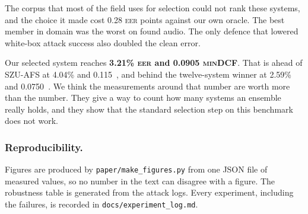 \documentclass[twocolumn,a4paper,11pt]{article}
\newcommand{\eer}{\textsc{eer}}
\newcommand{\mindcf}{\textsc{minDCF}}
\begin{document}
The corpus that most of the field uses for selection could not rank these
systems, and the choice it made cost 0.28 \eer{} points against our own
oracle. The best member in domain was the worst on found audio. The only
defence that lowered white-box attack success also doubled the clean error.

Our selected system reaches \textbf{3.21\% \eer{} and 0.0905 \mindcf{}}. That is
ahead of SZU-AFS at 4.04\% and 0.115~\cite{szuafs}, and behind the
twelve-system winner at 2.59\% and 0.0750~\cite{ustc2024}. We think the
measurements around that number are worth more than the number. They give a
way to count how many systems an ensemble really holds, and they show that the
standard selection step on this benchmark does not work.

\subsubsection*{Reproducibility.}
Figures are produced by \texttt{paper/make\_figures.py} from one JSON file of
measured values, so no number in the text can disagree with a figure. The
robustness table is generated from the attack logs. Every experiment,
including the failures, is recorded in \texttt{docs/experiment\_log.md}.



\end{document}
